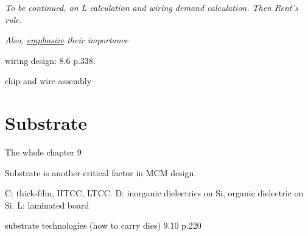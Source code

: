 \begin{spacing}{1.5}
\textit{To be continued, on L calculation and wiring demand calculation. Then Rent's rule. } 

\textit{Also, \underline{emphasize} their importance}

wiring design: 8.6 p.338. \cite{tummala2001fundamentals}

chip and wire assembly

\section{Substrate}

The whole chapter 9 \cite{chen2006vlsi}

Substrate is another critical factor in MCM design. 

C: thick-film, HTCC, LTCC. D: inorganic dielectrics on Si, organic dielectric on Si. L: laminated board

substrate technologies (how to carry dies) 9.10 p.220 \cite{chen2006vlsi} 

\end{spacing}
\newpage
